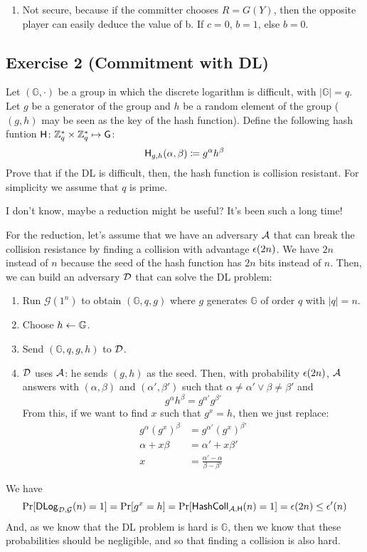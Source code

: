 \begin{solution}
\begin{enumerate}
		\item Not secure, because if the committer chooses $R = G(Y)$, then the opposite player can easily deduce the value of b. If $c = 0$, $b = 1$, else $b = 0$.
	\end{enumerate}
\end{solution}



\subsection{Exercise 2 (Commitment with DL)}

Let $(\mathbb{G}, \cdot)$ be a group in which the discrete logarithm is difficult, with $|\mathbb{G}|=q$.
Let $g$ be a generator of the group and $h$ be a random element of the group ($(g, h)$ may be seen as the key of the hash function).
Define the following hash funtion $\mathsf{H}\colon \mathbb{Z}^*_q \times \mathbb{Z}^*_q \mapsto \mathsf{G}$:
\[ \mathsf{H}_{g,h} (\alpha, \beta) \coloneqq g^\alpha h^\beta \]
Prove that if the DL is difficult, then, the hash function is collision resistant.
For simplicity we assume that $q$ is prime.


\begin{solution}
	I don't know, maybe a reduction might be useful? It's been such a long time!

	For the reduction, let's assume that we have an adversary $\mathcal{A}$ that can break the collision resistance by finding a collision with advantage $\epsilon(2n)$.
	We have $2n$ instead of $n$ because the seed of the hash function has $2n$ bits instead of $n$.
	Then, we can build an adversary $\mathcal{D}$ that can solve the DL problem:
	\begin{enumerate}
		\item Run $\mathcal{G}(1^n)$ to obtain $(\mathbb{G}, q, g)$ where $g$ generates $\mathbb{G}$ of order $q$ with $|q|=n$.
		\item Choose $h \leftarrow \mathbb{G}$.
		\item Send $(\mathbb{G}, q, g, h)$ to $\mathcal{D}$.
		\item $\mathcal{D}$ uses $\mathcal{A}$: he sends $(g, h)$ as the seed.
		Then, with probability $\epsilon(2n)$, $\mathcal{A}$ answers with $(\alpha, \beta)$ and $(\alpha', \beta')$ such that $\alpha\neq\alpha' \vee \beta\neq\beta'$ and
		\[ g^\alpha h^\beta = g^{\alpha'} g^{\beta'} \]
		From this, if we want to find $x$ such that $g^x=h$, then we just replace:
		\begin{align*}
		g^\alpha (g^x)^\beta &= g^{\alpha'} (g^x)^{\beta'} \\
		\alpha + x \beta &= \alpha' + x \beta' \\
		x &= \frac{\alpha'-\alpha}{\beta-\beta'}
		\end{align*}
	\end{enumerate}
	We have
	\[ \Pr[\mathsf{DLog}_{\mathcal{D}, \mathcal{G}}(n)=1] = \Pr[g^x=h] = \Pr[\mathsf{HashColl}_{\mathcal{A}, \mathsf{H}}(n)=1] = \epsilon(2n) \le \epsilon'(n)\]
	And, as we know that the DL problem is hard is $\mathbb{G}$, then we know that these probabilities should be negligible, and so that finding a collision is also hard.
\end{solution}



